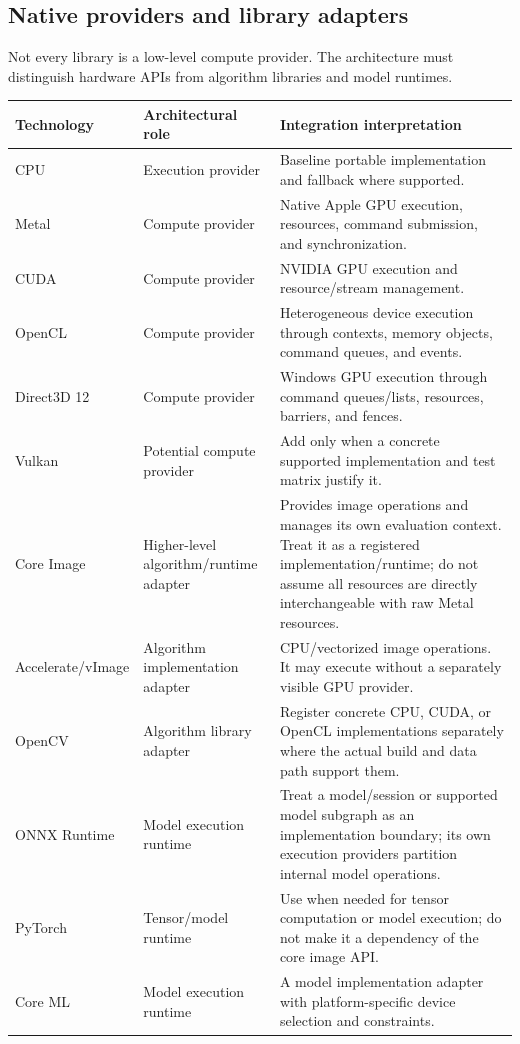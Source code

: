 \documentclass[11pt,a4paper,oneside]{article}
\begin{document}
\subsection{Native providers and library adapters}

Not every library is a low-level compute provider. The architecture must distinguish hardware APIs from algorithm libraries and model runtimes.

\begin{longtable}{@{}L{0.21\textwidth}L{0.27\textwidth}Z{0.42\textwidth}@{}}
\toprule
\textbf{Technology} & \textbf{Architectural role} & \textbf{Integration interpretation} \\
\midrule
CPU & Execution provider & Baseline portable implementation and fallback where supported. \\
Metal & Compute provider & Native Apple GPU execution, resources, command submission, and synchronization. \\
CUDA & Compute provider & NVIDIA GPU execution and resource/stream management. \\
OpenCL & Compute provider & Heterogeneous device execution through contexts, memory objects, command queues, and events. \\
Direct3D 12 & Compute provider & Windows GPU execution through command queues/lists, resources, barriers, and fences. \\
Vulkan & Potential compute provider & Add only when a concrete supported implementation and test matrix justify it. \\
Core Image & Higher-level algorithm/runtime adapter & Provides image operations and manages its own evaluation context. Treat it as a registered implementation/runtime; do not assume all resources are directly interchangeable with raw Metal resources. \\
Accelerate/vImage & Algorithm implementation adapter & CPU/vectorized image operations. It may execute without a separately visible GPU provider. \\
OpenCV & Algorithm library adapter & Register concrete CPU, CUDA, or OpenCL implementations separately where the actual build and data path support them. \\
ONNX Runtime & Model execution runtime & Treat a model/session or supported model subgraph as an implementation boundary; its own execution providers partition internal model operations. \\
PyTorch & Tensor/model runtime & Use when needed for tensor computation or model execution; do not make it a dependency of the core image API. \\
Core ML & Model execution runtime & A model implementation adapter with platform-specific device selection and constraints. \\
\bottomrule
\end{longtable}
\end{document}
